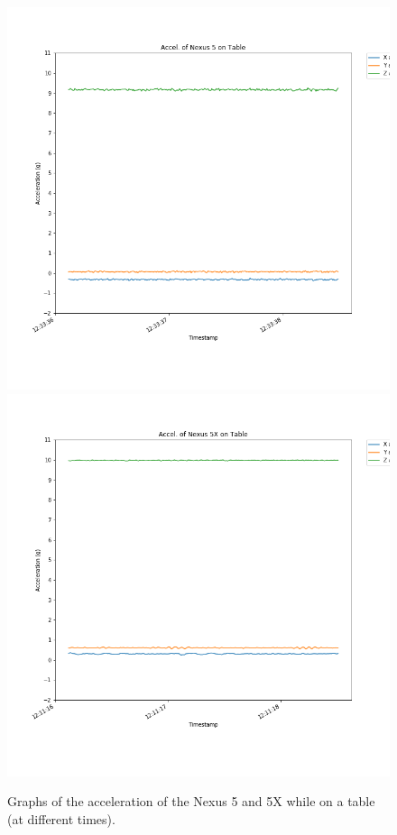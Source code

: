 \begin{figure}[t]
\center
\includegraphics[scale=0.25]{won_table}
\includegraphics[scale=0.25]{joanna_table}
\caption{Graphs of the acceleration of the Nexus 5 and 5X while on a table (at different times).}
\end{figure}

